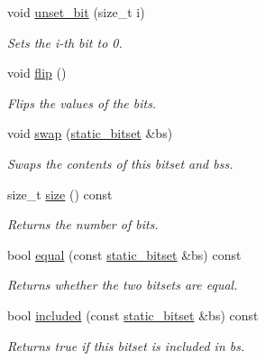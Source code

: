\begin{DoxyCompactItemize}
\mbox{\label{classlgraph_1_1utils_1_1static__bitset_af5f2d8f8f9d244e8f4768678ed8a7077}} 
void \hyperlink{classlgraph_1_1utils_1_1static__bitset_af5f2d8f8f9d244e8f4768678ed8a7077}{unset\+\_\+bit} (size\+\_\+t i)
\begin{DoxyCompactList}\small\item\em Sets the {\itshape i-\/th} bit to 0. \end{DoxyCompactList}\item 
void \hyperlink{classlgraph_1_1utils_1_1static__bitset_a430b19330c6f2a77f6ee15c3d652a2d6}{flip} ()
\begin{DoxyCompactList}\small\item\em Flips the values of the bits. \end{DoxyCompactList}\item 
void \hyperlink{classlgraph_1_1utils_1_1static__bitset_ae1737eb8f5aed69b6dd69c75334ef23a}{swap} (\hyperlink{classlgraph_1_1utils_1_1static__bitset}{static\+\_\+bitset} \&bs)
\begin{DoxyCompactList}\small\item\em Swaps the contents of this bitset and {\itshape bs\textquotesingle{}s}. \end{DoxyCompactList}\item 
size\+\_\+t \hyperlink{classlgraph_1_1utils_1_1static__bitset_a89b2297eb5ffa6e632a49627d99b994e}{size} () const
\begin{DoxyCompactList}\small\item\em Returns the number of bits. \end{DoxyCompactList}\item 
bool \hyperlink{classlgraph_1_1utils_1_1static__bitset_ace2e45ef0ed9d26bab0153c32dd4a74e}{equal} (const \hyperlink{classlgraph_1_1utils_1_1static__bitset}{static\+\_\+bitset} \&bs) const
\begin{DoxyCompactList}\small\item\em Returns whether the two bitsets are equal. \end{DoxyCompactList}\item 
bool \hyperlink{classlgraph_1_1utils_1_1static__bitset_a28690f7e3bb35b839a80fbb2bcd66389}{included} (const \hyperlink{classlgraph_1_1utils_1_1static__bitset}{static\+\_\+bitset} \&bs) const
\begin{DoxyCompactList}\small\item\em Returns true if this bitset is included in {\itshape bs}. \end{DoxyCompactList}\item 

\end{DoxyCompactItemize}
